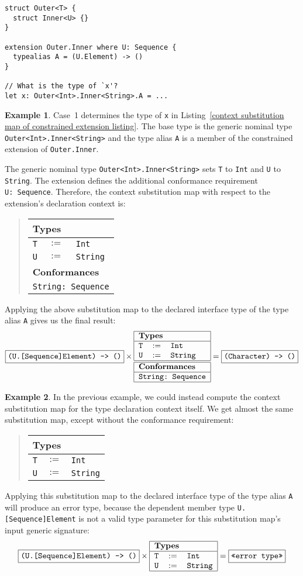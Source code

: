 \documentclass[a4paper,headsepline,bibliography=totoc,toc=flat,fleqn,twoside=semi]{scrbook}
\theoremstyle{definition}
\theoremstyle{definition}
\newtheorem{example}{Example}[chapter]
\theoremstyle{definition}
\newcommand{\ttbox}[1]{\boxed{\mbox{\vphantom{pI\texttt{pI}}\texttt{#1}}}}
\newcommand{\SubMap}[1]{\begin{tabular}{|lll|}
\hline
\multicolumn{3}{|l|}{\textbf{Types}}\\
\hline
#1\\
\hline
\end{tabular}}
\newcommand{\SubMapC}[2]{\begin{tabular}{|lll|}
\hline
\multicolumn{3}{|l|}{\textbf{Types}}\\
\hline
#1\\
\hline
\hline
\multicolumn{3}{|l|}{\textbf{Conformances}}\\
\hline
#2\\
\hline
\end{tabular}}
\newcommand{\SubType}[2]{\texttt{#1}&$:=$&\texttt{#2}}
\newcommand{\SubConf}[1]{\multicolumn{3}{|l|}{\texttt{#1}}}
\begin{document}
\begin{listing}\label{context substitution map of constrained extension listing}
\begin{Verbatim}
struct Outer<T> {
  struct Inner<U> {}
}

extension Outer.Inner where U: Sequence {
  typealias A = (U.Element) -> ()
}

// What is the type of `x'?
let x: Outer<Int>.Inner<String>.A = ...
\end{Verbatim}
\end{listing}
\begin{example}
Case~1 determines the type of \texttt{x} in Listing~\ref{context substitution map of constrained extension listing}. The base type is the generic nominal type \texttt{Outer<Int>.Inner<String>} and the type alias \texttt{A} is a member of the constrained extension of \texttt{Outer.Inner}.

The generic nominal type \texttt{Outer<Int>.Inner<String>} sets \texttt{T} to \texttt{Int} and \texttt{U} to \texttt{String}. The extension defines the additional conformance requirement \texttt{U:~Sequence}. Therefore, the context substitution map with respect to the extension's declaration context is:
\begin{quote}
\SubMapC{
\SubType{T}{Int}\\
\SubType{U}{String}
}{
\SubConf{String:\ Sequence}
}
\end{quote}
Applying the above substitution map to the declared interface type of the type alias \texttt{A} gives us the final result:
\[
\ttbox{(U.[Sequence]Element) -> ()} \times
\SubMapC{
\SubType{T}{Int}\\
\SubType{U}{String}
}{
\SubConf{String:\ Sequence}
} = \ttbox{(Character) -> ()}\]
\end{example}
\begin{example}
In the previous example, we could instead compute the context substitution map for the type declaration context itself. We get almost the same substitution map, except without the conformance requirement:
\begin{quote}
\SubMap{
\SubType{T}{Int}\\
\SubType{U}{String}
}
\end{quote}
Applying this substitution map to the declared interface type of the type alias \texttt{A} will produce an error type, because the dependent member type \texttt{U.[Sequence]Element} is not a valid type parameter for this substitution map's input generic signature:
\[
\ttbox{(U.[Sequence]Element) -> ()} \times
\SubMap{
\SubType{T}{Int}\\
\SubType{U}{String}
} = \ttbox{<<error type>>}\]
\end{example}
\end{document}
